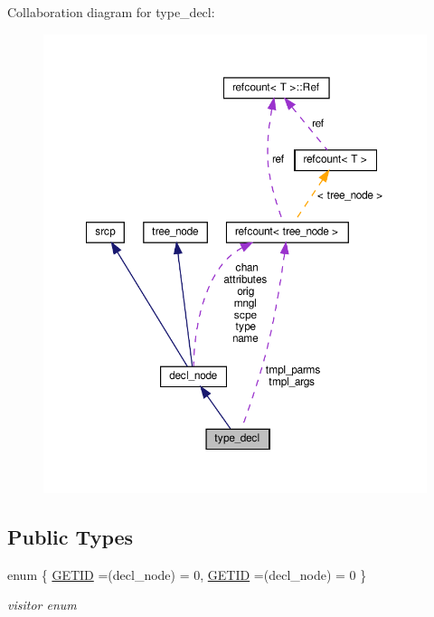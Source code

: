 Collaboration diagram for type\+\_\+decl\+:
\nopagebreak
\begin{figure}[H]
\begin{center}
\leavevmode
\includegraphics[width=350pt]{d8/d79/structtype__decl__coll__graph}
\end{center}
\end{figure}
\subsection*{Public Types}
\begin{DoxyCompactItemize}
\item 
enum \{ \hyperlink{structtype__decl_a78539c8c823f3a6c8849d459da77024babc93e770294b80c9d5c835a9fa822bb9}{G\+E\+T\+ID} =(decl\+\_\+node) = 0, 
\hyperlink{structtype__decl_a78539c8c823f3a6c8849d459da77024babc93e770294b80c9d5c835a9fa822bb9}{G\+E\+T\+ID} =(decl\+\_\+node) = 0
 \}\begin{DoxyCompactList}\small\item\em visitor enum \end{DoxyCompactList}
\end{DoxyCompactItemize}
